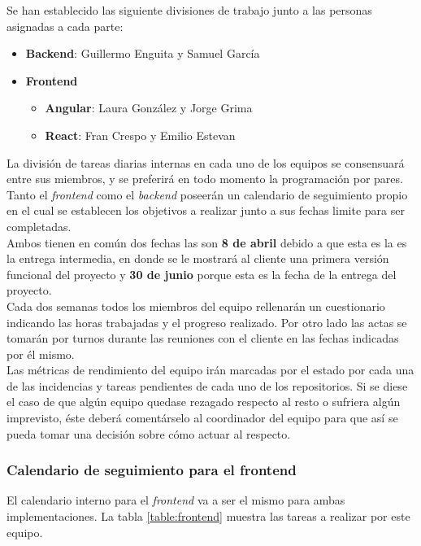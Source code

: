 \documentclass[11pt, a4paper, titlepage]{article}
\begin{document}
Se han establecido las siguiente divisiones de trabajo junto a las personas asignadas a cada parte:

\begin{itemize}
    \item \textbf{Backend}: Guillermo Enguita y Samuel García
    \item \textbf{Frontend}
    \begin{itemize} 
        \item \textbf{Angular}: Laura González y Jorge Grima
        \item \textbf{React}: Fran Crespo y Emilio Estevan
    \end{itemize}
\end{itemize}

La división de tareas diarias internas en cada uno de los equipos se consensuará entre sus miembros, y se preferirá en todo momento la programación por pares.\\

Tanto el \textit{frontend} como el \textit{backend} poseerán un calendario de seguimiento propio en el cual se establecen los objetivos a realizar junto a sus fechas limite para ser completadas. \\

Ambos tienen en común dos fechas las son \textbf{8 de abril} debido a que esta es la es la entrega intermedia, en donde se le mostrará al cliente una primera versión funcional del proyecto
y \textbf{30 de junio} porque esta es la fecha de la entrega del proyecto.\\

Cada dos semanas todos los miembros del equipo rellenarán un cuestionario indicando las horas trabajadas y el progreso realizado. Por otro lado las actas se tomarán por turnos durante las reuniones con el cliente en las fechas indicadas por él mismo.\\

Las métricas de rendimiento del equipo irán marcadas por el estado por cada una de las incidencias y tareas pendientes de cada uno de los repositorios. Si se diese el caso de que algún equipo quedase rezagado respecto al resto o sufriera algún imprevisto, éste deberá comentárselo al coordinador del equipo para que así se pueda tomar una decisión sobre cómo actuar al respecto. 

\subsubsection{Calendario de seguimiento para el frontend}
El calendario interno para el \textit{frontend} va a ser el mismo para ambas implementaciones. La tabla \ref{table:frontend} muestra las tareas a realizar por este equipo. \newline
\end{document}
